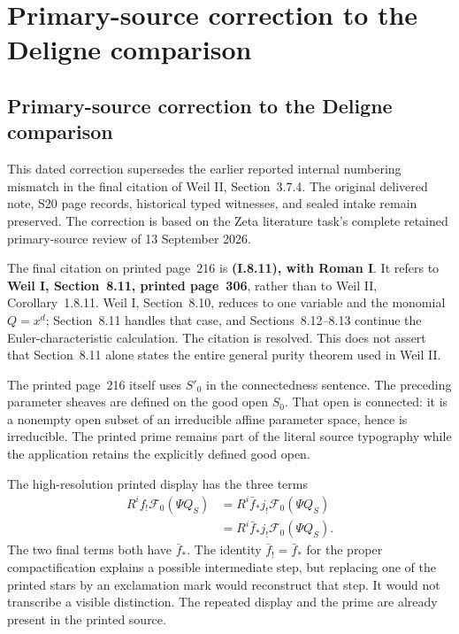 \begingroup

\section{Primary-source correction to the Deligne comparison}


\subsection{Primary-source correction to the Deligne comparison}
\label{sec:deligne-primary-source-correction}

This dated correction supersedes the earlier reported internal numbering
mismatch in the final citation of Weil II, Section~3.7.4. The original
delivered note, S20 page records, historical typed witnesses, and sealed
intake remain preserved. The correction is based on the Zeta literature
task's complete retained primary-source review of 13 September 2026.

The final citation on printed page~216 is \textbf{(I.8.11), with Roman I}.
It refers to \textbf{Weil I, Section~8.11, printed page~306}, rather than
to Weil II, Corollary~1.8.11. Weil I, Section~8.10, reduces to one variable
and the monomial $Q=x^d$; Section~8.11 handles that case, and
Sections~8.12--8.13 continue the Euler-characteristic calculation.
The citation is resolved. This does not assert that Section~8.11 alone
states the entire general purity theorem used in Weil II.

The printed page~216 itself uses $S'_0$ in the connectedness sentence.
The preceding parameter sheaves are defined on the good open $S_0$.
That open is connected: it is a nonempty open subset of an irreducible
affine parameter space, hence is irreducible. The printed prime remains
part of the literal source typography while the application retains
the explicitly defined good open.

The high-resolution printed display has the three terms
\[
\begin{aligned}
 R^if_!\mathcal F_0(\Psi Q_S)
 &=R^i\bar f_*j_!\mathcal F_0(\Psi Q_S)\\
 &=R^i\bar f_*j_!\mathcal F_0(\Psi Q_S).
\end{aligned}
\]
The two final terms both have $\bar f_*$. The identity
$\bar f_!=\bar f_*$ for the proper compactification explains a
possible intermediate step, but replacing one of the printed stars
by an exclamation mark would reconstruct that step. It would not
transcribe a visible distinction. The repeated display and the prime
are already present in the printed source.

